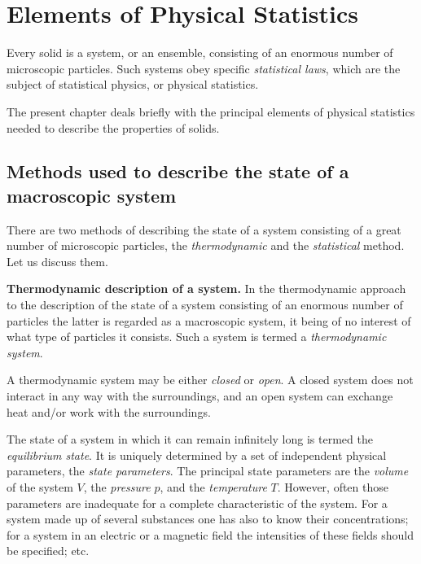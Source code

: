 

\chapter[Elements of Physical Statistics]{Elements of Physical Statistics}\label{chap:3}

Every solid is a system, or an ensemble, consisting of an enormous number of microscopic particles. Such systems obey specific \textit{statistical laws}, which are the subject of statistical physics, or physical statistics.

The present chapter deals briefly with the principal elements of physical statistics needed to describe the properties of solids.

\section{Methods used to describe the state of a macroscopic system}\label{sec:23}

There are two methods of describing the state of a system consisting of a great number of microscopic particles, the \textit{thermodynamic} and the \textit{statistical} method. Let us discuss them.

\textbf{Thermodynamic description of a system.} In the thermodynamic approach to the description of the state of a system consisting of an enormous number of particles the latter is regarded as a macroscopic system, it being of no interest of what type of particles it consists. Such a system is termed a \textit{thermodynamic system}.

A thermodynamic system may be either \textit{closed} or \textit{open}. A closed system does not interact in any way with the surroundings, and an open system can exchange heat and/or work with the surroundings.

The state of a system in which it can remain infinitely long is termed the \textit{equilibrium state}. It is uniquely determined by a set of independent physical parameters, the \textit{state parameters}. The principal state parameters are the \textit{volume} of the system $V$, the \textit{pressure} $p$, and the \textit{temperature} $T$. However, often those parameters are inadequate for a complete characteristic of the system. For a system made up of several substances one has also to know their concentrations; for a system in an electric or a magnetic field the intensities of these fields should be specified; etc.

